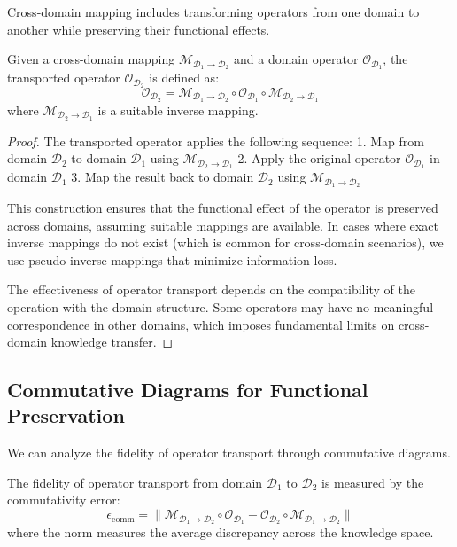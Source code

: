 Cross-domain mapping includes transforming operators from one domain to another while preserving their functional effects.

\begin{theorem}
Given a cross-domain mapping $\mathcal{M}_{\mathcal{D}_1 \rightarrow \mathcal{D}_2}$ and a domain operator $\mathcal{O}_{\mathcal{D}_1}$, the transported operator $\mathcal{O}_{\mathcal{D}_2}$ is defined as:
\begin{equation}
\mathcal{O}_{\mathcal{D}_2} = \mathcal{M}_{\mathcal{D}_1 \rightarrow \mathcal{D}_2} \circ \mathcal{O}_{\mathcal{D}_1} \circ \mathcal{M}_{\mathcal{D}_2 \rightarrow \mathcal{D}_1}
\end{equation}
where $\mathcal{M}_{\mathcal{D}_2 \rightarrow \mathcal{D}_1}$ is a suitable inverse mapping.
\end{theorem}

\begin{proof}
The transported operator applies the following sequence:
1. Map from domain $\mathcal{D}_2$ to domain $\mathcal{D}_1$ using $\mathcal{M}_{\mathcal{D}_2 \rightarrow \mathcal{D}_1}$
2. Apply the original operator $\mathcal{O}_{\mathcal{D}_1}$ in domain $\mathcal{D}_1$
3. Map the result back to domain $\mathcal{D}_2$ using $\mathcal{M}_{\mathcal{D}_1 \rightarrow \mathcal{D}_2}$

This construction ensures that the functional effect of the operator is preserved across domains, assuming suitable mappings are available. In cases where exact inverse mappings do not exist (which is common for cross-domain scenarios), we use pseudo-inverse mappings that minimize information loss.

The effectiveness of operator transport depends on the compatibility of the operation with the domain structure. Some operators may have no meaningful correspondence in other domains, which imposes fundamental limits on cross-domain knowledge transfer.
\end{proof}

\subsection{Commutative Diagrams for Functional Preservation}

We can analyze the fidelity of operator transport through commutative diagrams.

\begin{theorem}
The fidelity of operator transport from domain $\mathcal{D}_1$ to $\mathcal{D}_2$ is measured by the commutativity error:
\begin{equation}
\epsilon_{\text{comm}} = \|\mathcal{M}_{\mathcal{D}_1 \rightarrow \mathcal{D}_2} \circ \mathcal{O}_{\mathcal{D}_1} - \mathcal{O}_{\mathcal{D}_2} \circ \mathcal{M}_{\mathcal{D}_1 \rightarrow \mathcal{D}_2}\|
\end{equation}
where the norm measures the average discrepancy across the knowledge space.
\end{theorem}

